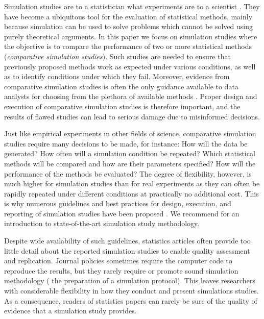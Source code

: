 \documentclass[a4paper, 11pt]{article}
\begin{document}
Simulation studies are to a statistician what experiments are to a scientist 
\citep{Hoaglin1975}. They have become a ubiquitous tool for the evaluation of 
statistical methods, mainly because simulation can be used to
solve problems which cannot be solved using purely theoretical arguments.
In this paper we focus on simulation studies where the objective is to compare
the performance of two or more statistical methods (\emph{comparative simulation
studies}). Such studies are needed to ensure that previously proposed methods
work as expected under various conditions, as well as to identify conditions under which
they fail. Moreover, evidence from comparative simulation studies is often the
only guidance available to data analysts for choosing from the plethora of
available methods \citep{Boulesteix2013, Boulesteix2017b}. Proper design and
execution of comparative simulation studies is therefore important, and the 
results of flawed studies can lead to serious damage due to misinformed decisions.

Just like empirical experiments in other fields of science, comparative simulation 
studies require many decisions to be made, for instance: How will the data be generated?
How often will a simulation condition be repeated? Which statistical methods will be 
compared and how are their parameters specified? How will the performance of the methods 
be evaluated? The degree of flexibility, however, is much higher for simulation
studies than for real experiments as they can often be rapidly repeated under different
conditions at practically no additional cost. This is why numerous guidelines
and best practices for design, execution, and reporting of simulation studies
have been proposed \citep{Hoaglin1975, Holford2000, Burton2006, Smith2010,
OKelly2016, Monks2018, Elofsson2019, Morris2019, Boulesteix2020B}. We
recommend \citet{Morris2019} for an introduction to state-of-the-art simulation
study methodology. 

Despite wide availability of such guidelines, statistics articles often 
provide too little detail about the reported simulation studies to enable
quality assessment and replication.
Journal policies sometimes require the computer code to reproduce the results,
but they rarely require or promote sound simulation methodology (\eg
the preparation of a simulation protocol). This leaves 
researchers with considerable flexibility in how they conduct and present
simulations studies. As a consequence, readers of statistics papers can
rarely be sure of the quality of evidence that a simulation study provides. 
\end{document}

